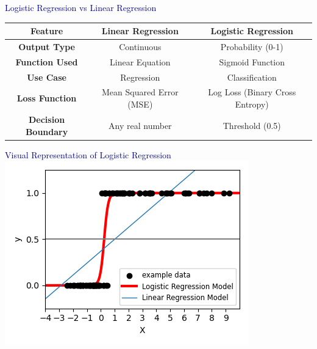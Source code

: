 \begin{frame}{\textcolor{darkblue}{Logistic Regression vs Linear Regression}}
    \begin{table}[]
    \small
        \centering
        \begin{tabular}{|c|c|c|}
            \hline
            \textbf{Feature} & \textbf{Linear Regression} & \textbf{Logistic Regression} \\
            \hline
            \textbf{Output Type} & Continuous & Probability (0-1) \\
            \hline
            \textbf{Function Used} & Linear Equation & Sigmoid Function \\
            \hline
            \textbf{Use Case} & Regression & Classification \\
            \hline
            \textbf{Loss Function} & Mean Squared Error (MSE) & Log Loss (Binary Cross Entropy) \\
            \hline
            \textbf{Decision Boundary} & Any real number & Threshold (0.5) \\
            \hline
        \end{tabular}
    \end{table}
\end{frame}

\begin{frame}{\textcolor{darkblue}{Visual Representation of Logistic Regression}}
    \centering
    \includegraphics[width=0.7\linewidth]{Sections/TP3/Images/logistic_regression.png}
\end{frame}


